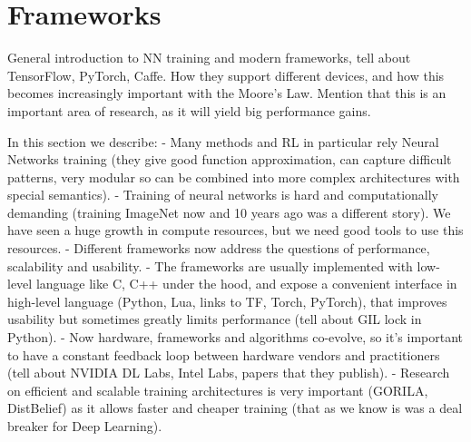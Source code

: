 \section{Frameworks}

General introduction to NN training and modern frameworks, tell about
TensorFlow, PyTorch, Caffe. How they support different devices, and how
this becomes increasingly important with the Moore's Law. Mention that this
is an important area of research, as it will yield big performance gains.

In this section we describe:
- Many methods and RL in particular rely Neural Networks training (they give good function approximation, can capture
difficult patterns, very modular so can be combined into more complex architectures with special semantics).
- Training of neural networks is hard and computationally demanding (training ImageNet now and 10 years ago was a different story). We have seen a huge growth in compute resources, but we need good tools to use this resources.
- Different frameworks now address the questions of performance, scalability and usability.
- The frameworks are usually implemented with low-level language like C, C++ under the hood, and expose
a convenient interface in high-level language (Python, Lua, links to TF, Torch, PyTorch),
that improves usability but sometimes greatly limits performance (tell about GIL lock in Python).
- Now hardware, frameworks and algorithms co-evolve, so it's important to have a constant feedback loop between
hardware vendors and practitioners (tell about NVIDIA DL Labs, Intel Labs, papers that they publish).
- Research on efficient and scalable training architectures is very important (GORILA, DistBelief) as it
allows faster and cheaper training (that as we know is was a deal breaker for Deep Learning).

